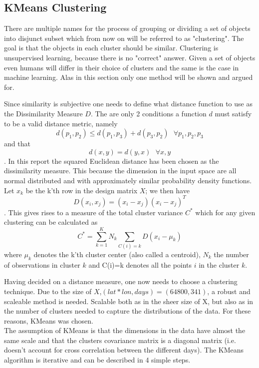 \subsection{KMeans Clustering}
There are multiple names for the process of grouping or dividing a set of objects into disjunct subset which from now on will be referred to as "clustering". The goal is that the objects in each cluster should be similar.
 Clustering is unsupervised learning, because there is no "correct" answer. 
Given a set of objects even humans will differ in their choice of clusters and the same is the case in machine learning.
 Alas in this section only one method will be shown and argued for.

Since similarity is subjective one needs to define what distance function to use as the Dissimilarity Measure $D$. 
The are only 2 conditions a function $d$ must satisfy to be a valid distance metric, namely
\begin{equation}
d(p_1,p_2)\le d(p_1,p_3)+d(p_3,p_2) \text{   }\forall p_1,p_2,p_3
\end{equation} and that
\begin{equation}
d(x,y)=d(y,x)  \text{   } \forall x,y
\end{equation}.
In this report the squared Euclidean distance has been chosen as the dissimilarity measure.
 This because the dimension in the input space are all normal distributed and with approximately similar probability density functions. Let $x_k$ be  the k'th row in the design matrix $X$; we then have 
\begin{equation}
D(x_i,x_j)=(x_i-x_j)(x_i-x_j)^{T}
\end{equation}.
This gives rises to a measure of the total cluster variance $C^{*}$ which for any given clustering can be calculated as
\begin{equation}
C^{*}=\sum^K_{k=1} N_k \sum_{C(i)=k} D(x_i-\mu_k)
\end{equation}
where $\mu_k$ denotes the k'th cluster center (also called a centroid), $N_k$ the number of observations in cluster $k$ and C(i)=k denotes all the points $i$ in the cluster $k$.  

Having decided on a distance measure, one now needs to choose a clustering technique.
 Due to the size of $X$,$ (lat*lon,days)=(64800,341)$, a robust and scaleable method is needed. 
Scalable both as in the sheer size of X, but also as in the number of clusters needed to capture the distributions of the data.
 For these reasons, KMeans was chosen. 
\\
The assumption of KMeans is that the dimensions in the data have almost the same scale and that the clusters covariance matrix is a diagonal matrix (i.e. doesn't account for cross correlation between the different days). 
The KMeans algorithm is iterative and can be described in 4 simple steps.

